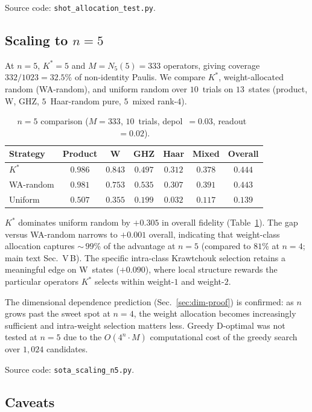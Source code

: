 \documentclass[twocolumn,prx,aps,superscriptaddress,longbibliography]{revtex4-2}
\begin{document}
Source code: \texttt{shot\_allocation\_test.py}.

\subsection{Scaling to $n = 5$}
\label{sec:scaling-n5}

At $n = 5$, $K^* = 5$ and $M = N_5(5) = 333$ operators, giving
coverage $332/1023 = 32.5$\% of non-identity Paulis.  We compare
$K^*$, weight-allocated random (WA-random), and uniform random over
$10$~trials on $13$~states (product, W, GHZ, $5$~Haar-random pure,
$5$~mixed rank-$4$).

\begin{table}[tb]
\centering
\caption{$n = 5$ comparison ($M = 333$, $10$~trials, depol~$= 0.03$,
readout~$= 0.02$).}
\label{tab:n5-scaling}
\begin{tabular}{lcccccc}
\toprule
Strategy & Product & W & GHZ & Haar & Mixed & Overall \\
\midrule
$K^*$     & $0.986$ & $0.843$ & $0.497$ & $0.312$ & $0.378$ & $0.444$ \\
WA-random & $0.981$ & $0.753$ & $0.535$ & $0.307$ & $0.391$ & $0.443$ \\
Uniform   & $0.507$ & $0.355$ & $0.199$ & $0.032$ & $0.117$ & $0.139$ \\
\bottomrule
\end{tabular}
\end{table}

$K^*$ dominates uniform random by $+0.305$ in overall fidelity
(Table~\ref{tab:n5-scaling}).  The gap versus WA-random narrows to
$+0.001$ overall, indicating that weight-class allocation captures
${\sim}\,99$\% of the advantage at $n = 5$ (compared to $81$\% at
$n = 4$; main text Sec.~V\,B).  The specific
intra-class Krawtchouk selection retains a meaningful edge on
W~states ($+0.090$), where local structure rewards the particular
operators $K^*$ selects within weight-$1$ and weight-$2$.

The dimensional dependence prediction
(Sec.~\ref{sec:dim-proof}) is confirmed: as $n$ grows past the
sweet spot at $n = 4$, the weight allocation becomes increasingly
sufficient and intra-weight selection matters less.  Greedy
D-optimal was not tested at $n = 5$ due to the $O(4^n \cdot M)$
computational cost of the greedy search over $1{,}024$ candidates.

Source code: \texttt{sota\_scaling\_n5.py}.

\subsection{Caveats}
\end{document}
